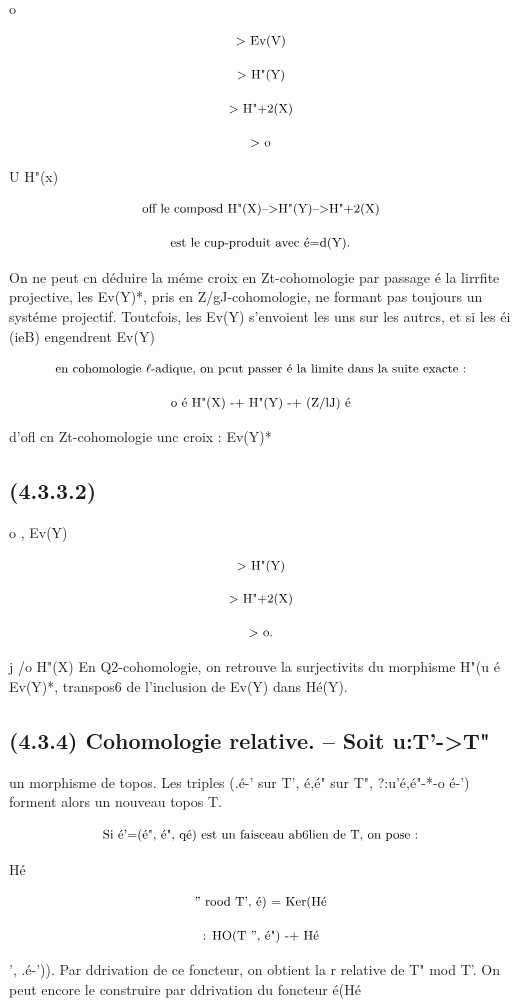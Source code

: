 \documentclass[11pt]{article}
\theoremstyle{remark}
\begin{document}
o

\[\text{\small > Ev(V)}\]

\[\text{\small > H"(Y)}\]

\[\text{\small > H"+2(X)}\]

\[\text{\small > o}\]

U H"(x)

\[\text{\small off le composd H"(X)-->H"(Y)-->H"+2(X)}\]

\[\text{\small est le cup-produit avec é=d(Y).}\]

On ne peut cn déduire la méme croix en Zt-cohomologie par passage é la lirrfite projective, les Ev(Y)*, pris en Z/gJ-cohomologie, ne formant pas toujours un systéme projectif. Toutcfois, les Ev(Y) s'envoient les uns sur les autrcs, et si les éi (ieB) engendrent Ev(Y)

\[\text{\small en cohomologie \(\ell\)-adique, on pcut passer é la limite dans la suite exacte :}\]

\[\text{\small o é H"(X) -+ H"(Y) -+ (Z/lJ) é}\]

d'ofl cn Zt-cohomologie unc croix : Ev(Y)*

\subsection*{(4.3.3.2)}

o , Ev(Y)

\[\text{\small > H"(Y)}\]

\[\text{\small > H"+2(X)}\]

\[\text{\small > o.}\]

j /o H"(X) En Q2-cohomologie, on retrouve la surjectivits du morphisme H"(u é Ev(Y)*, transpos6 de l'inclusion de Ev(Y) dans Hé(Y).

\subsection*{(4.3.4) Cohomologie relative. -- Soit u:T'->T"}

un morphisme de topos. Les triples (.é-' sur T', é,é" sur T", ?:u'é,é"-*-o é-') forment alors un nouveau topos T.

\[\text{\small Si é'=(é", é", qé) est un faisceau ab6lien de T, on pose :}\]

Hé

\[\text{\small '' rood T', é) = Ker(Hé}\]

\[\text{\small : HO(T '', é") -+ Hé}\]

', .é-')). Par ddrivation de ce foncteur, on obtient la r relative de T" mod T'. On peut encore le construire par ddrivation du foncteur é(Hé
\end{document}

